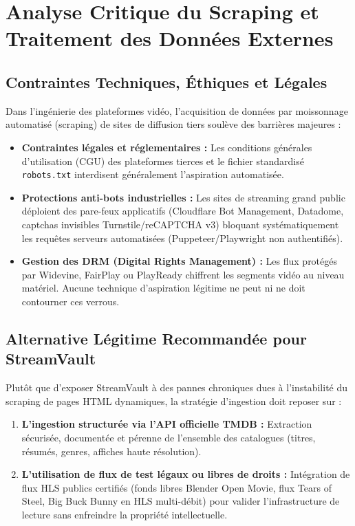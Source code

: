 \documentclass[11pt,a4paper]{article}
\begin{document}
\section{Analyse Critique du Scraping et Traitement des Données Externes}

\subsection{Contraintes Techniques, Éthiques et Légales}
Dans l'ingénierie des plateformes vidéo, l'acquisition de données par moissonnage automatisé (scraping) de sites de diffusion tiers soulève des barrières majeures :
\begin{itemize}
    \item \textbf{Contraintes légales et réglementaires :} Les conditions générales d'utilisation (CGU) des plateformes tierces et le fichier standardisé \texttt{robots.txt} interdisent généralement l'aspiration automatisée.
    \item \textbf{Protections anti-bots industrielles :} Les sites de streaming grand public déploient des pare-feux applicatifs (Cloudflare Bot Management, Datadome, captchas invisibles Turnstile/reCAPTCHA v3) bloquant systématiquement les requêtes serveurs automatisées (Puppeteer/Playwright non authentifiés).
    \item \textbf{Gestion des DRM (Digital Rights Management) :} Les flux protégés par Widevine, FairPlay ou PlayReady chiffrent les segments vidéo au niveau matériel. Aucune technique d'aspiration légitime ne peut ni ne doit contourner ces verrous.
\end{itemize}

\subsection{Alternative Légitime Recommandée pour StreamVault}
Plutôt que d'exposer StreamVault à des pannes chroniques dues à l'instabilité du scraping de pages HTML dynamiques, la stratégie d'ingestion doit reposer sur :
\begin{enumerate}
    \item \textbf{L'ingestion structurée via l'API officielle TMDB :} Extraction sécurisée, documentée et pérenne de l'ensemble des catalogues (titres, résumés, genres, affiches haute résolution).
    \item \textbf{L'utilisation de flux de test légaux ou libres de droits :} Intégration de flux HLS publics certifiés (fonds libres Blender Open Movie, flux Tears of Steel, Big Buck Bunny en HLS multi-débit) pour valider l'infrastructure de lecture sans enfreindre la propriété intellectuelle.
\end{enumerate}
\end{document}
